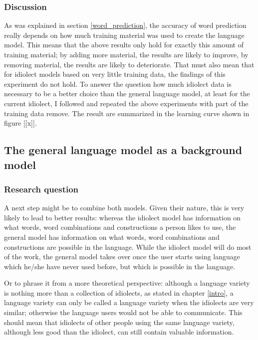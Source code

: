 \documentclass[12pt]{article}
\begin{document}
\subsubsection{Discussion}
As was explained in section \ref{word_prediction}, the accuracy of word prediction really depends on how much training material was used to create the language model. This means that the above results only hold for exactly this amount of training material; by adding more material, the results are likely to improve, by removing material, the results are likely to deteriorate. That must also mean that for idiolect models based on very little training data, the findings of this experiment do not hold. To answer the question how much idiolect data is necessary to be a better choice than the general language model, at least for the current idiolect, I followed  and repeated the above experiments with part of the training data remove. The result are summarized in the learning curve shown in figure [[x]].


\subsection{The general language model as a background model} \label{background}

\subsubsection{Research question}

A next step might be to combine both models. Given their nature, this is very likely to lead to better results: whereas the idiolect model has information on what words, word combinations and constructions a person likes to use, the general model has information on what words, word combinations and constructions are possible in the language. While the idiolect model will do most of the work, the general model takes over once the user starts using language which he/she have never used before, but which is possible in the language. 

Or to phrase it from a more theoretical perspective: although a language variety is nothing more than a collection of idiolects, as stated in chapter \ref{intro}, a language variety can only be called a language variety when the idiolects are very similar; otherwise the language users would not be able to communicate. This should mean that idiolects of other people using the same language variety, although less good than the idiolect, can still contain valuable information.
\end{document}
